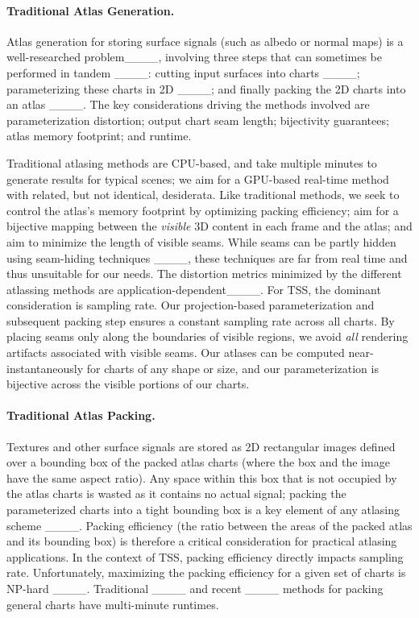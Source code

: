 \paragraph*{Traditional Atlas Generation.}
Atlas generation for storing surface signals (such as albedo or normal maps) is a well-researched problem____, involving three steps that can sometimes be performed in tandem ____: cutting input surfaces into charts ____; parameterizing these charts in 2D ____; and finally packing the 2D charts into an atlas ____. The key considerations driving the methods involved are parameterization distortion; output chart seam length; bijectivity guarantees; atlas memory footprint; and runtime.
 
Traditional atlasing methods are CPU-based, and take multiple minutes to generate results for typical scenes; we aim for a GPU-based real-time method with related, but not identical, desiderata. Like traditional methods, we seek to control the atlas's memory footprint by optimizing packing efficiency; aim for a bijective mapping between the {\em visible} 3D content in each frame and the atlas; and aim to minimize the length of visible seams.  While seams can be partly hidden using seam-hiding techniques ____, these techniques are far from real time and thus unsuitable for our needs. The distortion metrics minimized by the different atlassing methods are application-dependent____. For TSS, the dominant consideration is sampling rate. Our projection-based parameterization and subsequent packing step ensures a constant sampling rate across all charts. By placing seams only along the boundaries of visible regions, we avoid {\em all} rendering artifacts associated with visible seams. Our atlases can be computed near-instantaneously for charts of any shape or size, and our parameterization is bijective across the visible portions of our charts.

\paragraph*{Traditional Atlas Packing.} Textures and other surface signals are stored as 2D rectangular images defined over a bounding box of the packed atlas charts (where the box and the image have the same aspect ratio).  Any space within this box that is not occupied by the atlas charts is wasted as it contains no actual signal; packing the parameterized charts into a tight bounding box is a key element of any atlasing scheme ____. Packing efficiency (the ratio between the areas of the packed atlas and its bounding box) is therefore a critical consideration for practical atlasing applications. In the context of TSS, packing efficiency directly impacts sampling rate. Unfortunately, maximizing the packing efficiency for a given set of charts is NP-hard ____. Traditional ____ and recent ____ methods for packing general charts have multi-minute runtimes. 

